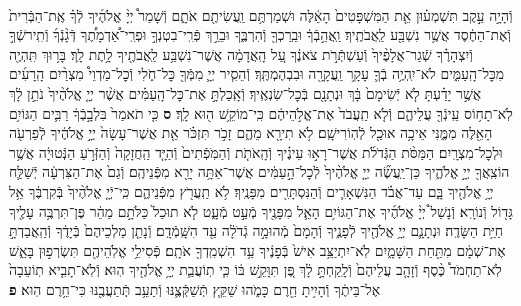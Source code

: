 \documentclass[twoside, openany, parskip=half, 11pt]{book}
\begin{document}
\begin{footnotesize}
\begin{multicols}{2}
\\
וְֿהָיָ֣ה עֵ֣קֶב תִּשְׁמְע֗וּן אֵ֤ת הַמִּשְׁפָּטִים֙ הָאֵ֔לֶּה וּשְׁמַרְתֶּ֥ם וַֽעֲשִׂיתֶ֖ם אֹתָ֑ם וְֿשָׁמַר֩ יְיָ֨ אֱלֹהֶ֜יךָ לְֿךָ֗ אֶֽת־הַבְּֿרִית֙ וְֿאֶת־הַחֶ֔סֶד אֲשֶׁ֥ר נִשְׁבַּ֖ע לַֽאֲבֹתֶֽיךָ׃ וַֽאֲהֵ֣בְֿךָ֔ וּבֵֽרַכְךָ֖ וְֿהִרְבֶּ֑ךָ וּבֵרַ֣ךְ פְּֿרִֽי־בִטְנְךָ֣ וּפְרִֽי־אַ֠דְמָתֶ֠ךָ דְּֿגָ֨נְֿךָ֜ וְֿתִֽירשְֿׁךָ֣ וְֿיִצְהָרֶ֗ךָ שְֿׁגַר־אֲלָפֶ֨יךָ֙ וְֿעַשְׁתְּֿרֹ֣ת צֹאנֶ֔ךָ עַ֚ל הָֽאֲדָמָ֔ה אֲשֶׁר־נִשְׁבַּ֥ע לַֽאֲבֹתֶ֖יךָ לָ֥תֶת לָֽךְ׃ בָּר֥וּךְ תִּֽהְיֶ֖ה מִכׇּל־הָֽעַמִּ֑ים לֹא־יִֽהְיֶ֥ה בְֿךָ֛ עָקָ֥ר וַֽעֲקָרָ֖ה וּבִבְהֶמְתֶּֽךָ׃ וְֿהֵסִ֧יר יְיָ֛ מִמְּֿךָ֖ כׇּל־חֹ֑לִי וְֿכׇל־מַדְוֵי֩ מִצְרַ֨יִם הָֽרָעִ֜ים אֲשֶׁ֣ר יָדַ֗עְתָּ לֹ֤א יְֿשִׂימָם֙ בָּ֔ךְ וּנְתָנָ֖ם בְּֿכׇל־שֽׂנְאֶֽיךָ׃ וְֿאָֽכַלְתָּ֣ אֶת־כׇּל־הָֽעַמִּ֗ים אֲשֶׁ֨ר יְיָ֤ אֱלֹהֶ֨יךָ֙ נֹתֵ֣ן לָ֔ךְ לֹֽא־תָח֥וֹס עֵֽינְֿךָ֖ עֲלֵיהֶ֑ם וְֿלֹ֤א תַֽעֲבֹד֙ אֶת־אֱלֹ֣הֵיהֶ֔ם כִּֽי־מוֹקֵ֥שׁ ה֖וּא לָֽךְ׃ \textbf{ס} כִּ֤י תֹאמַר֙ בִּלְבָ֣בְֿךָ֔ רַבִּ֛ים הַגּוֹיִ֥ם הָאֵ֖לֶּה מִמֶּ֑נִּי אֵיכָ֥ה אוּכַ֖ל לְֿהֽוֹרִישָֽׁם׃ לֹ֥א תִירָ֖א מֵהֶ֑ם זָכֹ֣ר תִּזְכֹּ֗ר אֵ֤ת אֲשֶׁר־עָשָׂה֙ יְיָ֣ אֱלֹהֶ֔יךָ לְֿפַרְעֹ֖ה וּלְכׇל־מִצְרָֽיִם׃ הַמַּסֹּ֨ת הַגְּֿדֹלֹ֜ת אֲשֶׁר־רָא֣וּ עֵינֶ֗יךָ וְֿהָֽאֹתֹ֤ת וְֿהַמֹּֽפְֿתִים֙ וְֿהַיָּ֤ד הַֽחֲזָקָה֙ וְֿהַזְּֿרֹ֣עַ הַנְּֿטוּיָ֔ה אֲשֶׁ֥ר הוֹצִֽאֲךָ֖ יְיָ֣ אֱלֹהֶ֑יךָ כֵּן־יַֽעֲשֶׂ֞ה יְיָ֤ אֱלֹהֶ֨יךָ֙ לְֿכׇל־הָ֣עַמִּ֔ים אֲשֶׁר־אַתָּ֥ה יָרֵ֖א מִפְּֿנֵיהֶֽם׃ וְֿגַם֙ אֶת־הַצִּרְעָ֔ה יְֿשַׁלַּ֛ח יְיָ֥ אֱלֹהֶ֖יךָ בָּ֑ם עַד־אֲבֹ֗ד הַנִּשְׁאָרִ֛ים וְֿהַנִּסְתָּרִ֖ים מִפָּנֶֽיךָ׃ לֹ֥א תַֽעֲרֹ֖ץ מִפְּֿנֵיהֶ֑ם כִּֽי־יְֿיָ֤ אֱלֹהֶ֨יךָ֙ בְּֿקִרְבֶּ֔ךָ אֵ֥ל גָּד֖וֹל וְֿנוֹרָֽא׃  וְֿנָשַׁל֩ יְיָ֨ אֱלֹהֶ֜יךָ אֶת־הַגּוֹיִ֥ם הָאֵ֛ל מִפָּנֶ֖יךָ מְֿעַ֣ט מְֿעָ֑ט לֹ֤א תוּכַל֙ כַּלֹּתָ֣ם מַהֵ֔ר פֶּן־תִּרְבֶּ֥ה עָלֶ֖יךָ חַיַּ֥ת הַשָּׂדֶֽה׃ וּנְתָנָ֛ם יְיָ֥ אֱלֹהֶ֖יךָ לְֿפָנֶ֑יךָ וְֿהָמָם֙ מְֿהוּמָ֣ה גְֿדֹלָ֔ה עַ֖ד הִשָּֽׁמְֿדָֽם׃ וְֿנָתַ֤ן מַלְכֵיהֶם֙ בְּֿיָדֶ֔ךָ וְֿהַֽאֲבַדְתָּ֣ אֶת־שְׁמָ֔ם מִתַּ֖חַת הַשָּׁמָ֑יִם לֹֽא־יִתְיַצֵּ֥ב אִישׁ֙ בְּֿפָנֶ֔יךָ עַ֥ד הִשְׁמִֽדְךָ֖ אֹתָֽם׃ פְּֿסִילֵ֥י אֱלֹֽהֵיהֶ֖ם תִּשְׂרְפ֣וּן בָּאֵ֑שׁ לֹֽא־תַחְמֹד֩ כֶּ֨סֶף וְֿזָהָ֤ב עֲלֵיהֶם֙ וְֿלָֽקַחְתָּ֣ לָ֔ךְ פֶּ֚ן תִּוָּקֵ֣שׁ בּ֔וֹ כִּ֧י תֽוֹעֲבַ֛ת יְיָ֥ אֱלֹהֶ֖יךָ הֽוּא׃ וְֿלֹֽא־תָבִ֤יא תֽוֹעֵבָה֙ אֶל־בֵּיתֶ֔ךָ וְֿהָיִ֥יתָ חֵ֖רֶם כָּמֹ֑הוּ שַׁקֵּ֧ץ תְּֿשַׁקְּֿצֶ֛נּוּ וְֿתַעֵ֥ב תְּֽֿתַעֲבֶ֖נּוּ כִּי־חֵ֥רֶם הֽוּא׃ \textbf{פ}

\end{multicols}
\end{footnotesize}
\end{document}
